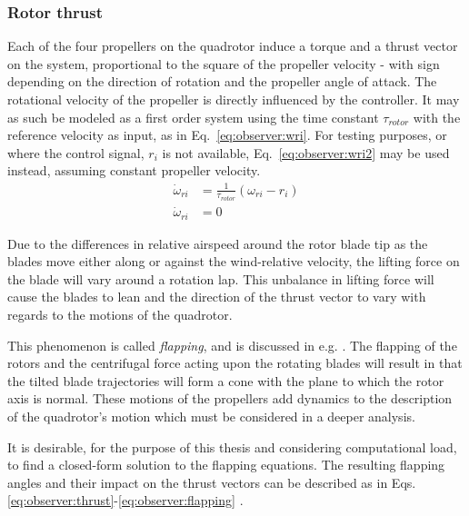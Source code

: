 \subsubsection{Rotor thrust}
\label{ssec:observer:thrust}
    Each of the four propellers on the quadrotor induce a torque
    and a thrust vector on the system, proportional to the square of the
    propeller velocity - with sign depending on the direction of rotation
    and the propeller angle of attack.
    The rotational velocity of the propeller is directly
    influenced by the controller. It may as such be modeled as a first order
    system using the time constant $\tau_{rotor}$ with
    the reference velocity as input, as in Eq.~\eqref{eq:observer:wri}.
    For testing purposes, or where the control signal, $r_{i}$ is not
    available, Eq.~\eqref{eq:observer:wri2} may be used instead,
    assuming constant propeller velocity.
    \begin{align}
        \dot{\omega}_{ri} &= \frac{1}{\tau_{rotor}} \left( \omega_{ri} - r_{i} \right) \label{eq:observer:wri} \\
        \dot{\omega}_{ri} &= 0 \label{eq:observer:wri2}
    \end{align}

    Due to the differences in relative airspeed around
    the rotor blade tip as the blades move either along or against
    the wind-relative velocity, the lifting force on the blade will vary
    around a rotation lap.
    This unbalance in lifting force will cause the blades to lean and the
    direction of the thrust vector to vary with regards to the motions of the quadrotor.

    This phenomenon is called \textit{flapping}, and is discussed
    in e.g. \citep{Pounds_modellingand}. The flapping of the rotors
    and the centrifugal force acting upon the rotating blades
    will result in that the tilted blade trajectories will
    form a cone with the plane to which the rotor axis is normal.
    These motions of the propellers add dynamics to the
    description of the quadrotor's motion which must be considered in a deeper analysis.

    It is desirable, for the purpose of this thesis and
    considering computational load, to find a closed-form
    solution to the flapping equations.
    The resulting flapping angles and their impact on
    the thrust vectors can be described as in Eqs.
    \eqref{eq:observer:thrust}-\eqref{eq:observer:flapping}
    \citep{Pounds_modellingand,prouty1995helicopter,leishman2002principles}.

